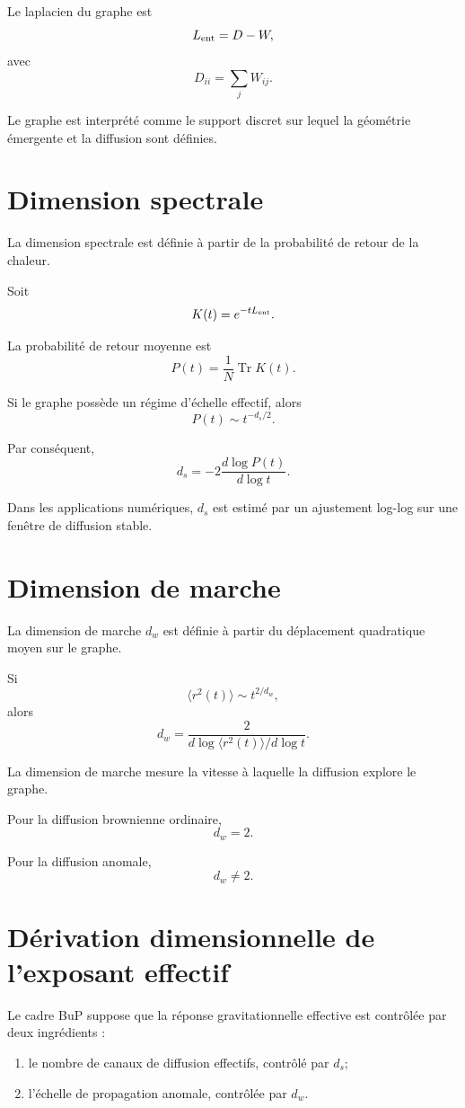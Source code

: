 \documentclass[11pt,a4paper]{article}
\begin{document}
Le laplacien du graphe est
\[
L_{\rm ent} = D - W,
\]
avec
\[
D_{ii} = \sum_j W_{ij}.
\]

Le graphe est interprété comme le support discret sur lequel la géométrie émergente et la diffusion sont définies.

\section{Dimension spectrale}

La dimension spectrale est définie à partir de la probabilité de retour de la chaleur.

Soit
\[
K(t) = e^{-t L_{\rm ent}}.
\]

La probabilité de retour moyenne est
\[
P(t) = \frac{1}{N} \operatorname{Tr} K(t).
\]

Si le graphe possède un régime d'échelle effectif, alors
\[
P(t) \sim t^{-d_s/2}.
\]

Par conséquent,
\[
d_s = -2 \frac{d \log P(t)}{d \log t}.
\]

Dans les applications numériques, \(d_s\) est estimé par un ajustement log-log sur une fenêtre de diffusion stable.

\section{Dimension de marche}

La dimension de marche \(d_w\) est définie à partir du déplacement quadratique moyen sur le graphe.

Si
\[
\langle r^2(t) \rangle \sim t^{2/d_w},
\]
alors
\[
d_w = \frac{2}{d \log \langle r^2(t) \rangle / d \log t}.
\]

La dimension de marche mesure la vitesse à laquelle la diffusion explore le graphe.

Pour la diffusion brownienne ordinaire,
\[
d_w = 2.
\]

Pour la diffusion anomale,
\[
d_w \neq 2.
\]

\section{Dérivation dimensionnelle de l'exposant effectif}

Le cadre BuP suppose que la réponse gravitationnelle effective est contrôlée par deux ingrédients :

\begin{enumerate}
    \item le nombre de canaux de diffusion effectifs, contrôlé par \(d_s\);
    \item l'échelle de propagation anomale, contrôlée par \(d_w\).
\end{enumerate}
\end{document}
